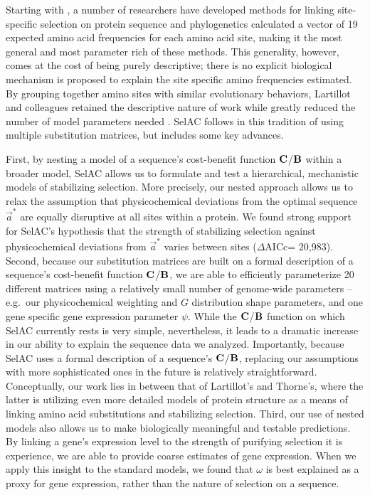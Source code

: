 \documentclass[12pt,letterpaper,fleqn]{article}
\newcommand{\PC}{physicochemical\xspace}
\newcommand{\Cost}{\ensuremath{\text{\textbf{C}}}\xspace}
\newcommand{\DeltaAICc}{\ensuremath{\Delta\text{AICc}}\xspace}
\newcommand{\Func}{\ensuremath{\text{\textbf{B}}}\xspace}
\newcommand{\selac}{SelAC\xspace}
\newcommand{\aoptvec}{\ensuremath{\Vec{a}^*}\xspace}
\begin{document}
Starting with \citet{HalpernAndBruno1998}, a number of researchers have developed methods for linking site-specific selection on protein sequence and phylogenetics\citep[e.g.~][]{KoshiEtAl1999,DimmicEtAl2000,KoshiAndGoldstein2001,RobinsonEtAl2003,LartillotAndPhilippe2004,ThorneEtAl2012,RodrigueAndLartillot2014} 
\citet{HalpernAndBruno1998} calculated  a vector of 19 expected amino acid frequencies for each amino acid site, making it the most general and most parameter rich of these methods.
This generality, however, comes at the cost of being purely descriptive; there is no explicit biological mechanism is proposed to explain the site specific amino frequencies estimated. 
By grouping together amino sites with similar evolutionary behaviors, Lartillot and colleagues retained the descriptive nature of \citet{HalpernAndBruno1998} work while greatly reduced the number of model parameters needed \citep{LartillotAndPhilippe2004,RodrigueAndLartillot2014}.
\selac follows in this tradition of using multiple substitution matrices, but includes some key advances. 

First, by nesting a model of a sequence's cost-benefit function \Cost/\Func within a broader model, \selac allows us to formulate and test a hierarchical, mechanistic models of stabilizing selection.
More precisely, our nested approach allows us to relax the assumption that \PC deviations from the optimal sequence \aoptvec are equally disruptive at all sites within a protein. 
We found strong support for \selac's hypothesis that the strength of stabilizing selection against \PC deviations from \aoptvec varies between sites (\DeltaAICc = 20,983). 
Second, because our substitution matrices are built on a formal description of a sequence's cost-benefit function \Cost/\Func, we are able to efficiently parameterize 20 different matrices using a relatively small number of genome-wide parameters -- e.g.~our \PC weighting and $G$ distribution shape parameters, and one gene specific gene expression parameter $\psi$. 
While the \Cost/\Func function on which \selac currently rests is very simple, nevertheless, it leads to a dramatic increase in our ability to explain the sequence data we analyzed.
Importantly, because \selac uses a formal description of a sequence's \Cost/\Func,  replacing our assumptions with more sophisticated ones in the future is relatively straightforward. 
Conceptually, our work lies in between that of Lartillot's and Thorne's, where the latter is utilizing even more detailed models of protein structure as a means of linking amino acid substitutions and stabilizing selection.
Third, our use of nested models also allows us to make biologically meaningful and testable predictions. By linking a gene's expression level to the strength of purifying selection it is experience, we are able to provide coarse estimates of gene expression. When we apply this insight to the standard models, we found that $\omega$ is best explained as a proxy for gene expression, rather than the nature of selection on a sequence.
\end{document}
